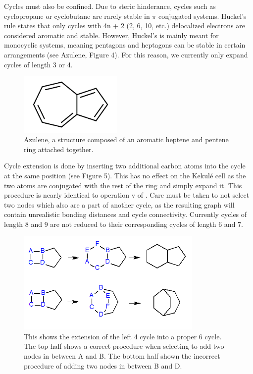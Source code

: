 \documentclass[12pt]{article}
\begin{document}
Cycles must also be confined. Due to steric hinderance, cycles such as cyclopropane or cyclobutane are rarely stable in $\pi$ conjugated systems. Huckel's rule states that only cycles with 4n + 2 (2, 6, 10, etc.) delocalized electrons are considered aromatic and stable. However, Huckel's is mainly meant for monocyclic systems, meaning pentagons and heptagons can be stable in certain arrangements (see Azulene, Figure 4). For this reason, we currently only expand cycles of length 3 or 4. 

\begin{figure}[ht!]
\centering
\includegraphics[width=50mm]{azulene.png}
\caption{Azulene, a structure composed of an aromatic heptene and pentene ring attached together.}
\end{figure}

Cycle extension is done by inserting two additional carbon atoms into the cycle at the same position (see Figure 5). This has no effect on the Kekul\'e cell as the two atoms are conjugated with the rest of the ring and simply expand it. This procedure is nearly identical to operation v of \cite{v06}. Care must be taken to not select two nodes which also are a part of another cycle, as the resulting graph will contain unrealistic bonding distances and cycle connectivity. Currently cycles of length 8 and 9 are not reduced to their corresponding cycles of length 6 and 7. 

\begin{figure}[ht!]
\centering
\includegraphics[width=90mm]{cycleExtension.png}
\caption{This shows the extension of the left 4 cycle into a proper 6 cycle. The top half shows a correct procedure when selecting to add two nodes in between A and B. The bottom half shown the incorrect procedure of adding two nodes in between B and D.}
\end{figure}
\end{document}
